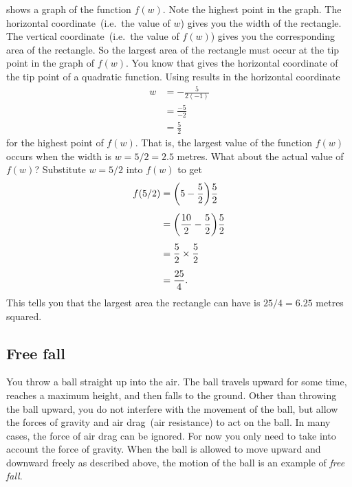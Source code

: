 \documentclass[a4paper,oneside,12pt]{article}
\begin{document}
\begin{solution}
 shows a graph of the function
$f(w)$.  Note the highest point in the graph.  The horizontal
coordinate~(i.e.~the value of $w$) gives you the width of the
rectangle.  The vertical coordinate~(i.e.~the value of $f(w)$) gives
you the corresponding area of the rectangle.  So the largest area of
the rectangle must occur at the tip point in the graph of $f(w)$.  You
know that  gives the
horizontal coordinate of the tip point of a quadratic function.  Using
 results in the horizontal
coordinate
\begin{align*}
w
&=
-\frac{5}{2(-1)} \\[4pt]
&=
\frac{-5}{-2} \\[4pt]
&=
\frac{5}{2}
\end{align*}
for the highest point of $f(w)$.  That is, the largest value of the
function $f(w)$ occurs when the width is $w = 5 / 2 = 2.5$ metres.
What about the actual value of $f(w)$?  Substitute $w = 5 / 2$ into
$f(w)$ to get
\begin{align*}
f(5/2)
&=
\parenthesis*{5 - \frac{5}{2}} \frac{5}{2} \\[4pt]
&=
\parenthesis*{\frac{10}{2} - \frac{5}{2}} \frac{5}{2} \\[4pt]
&=
\frac{5}{2} \times \frac{5}{2} \\[4pt]
&=
\frac{25}{4}.
\end{align*}
This tells you that the largest area the rectangle can have is
$25 / 4 = 6.25$ metres squared.
\end{solution}



\subsection*{Free fall}

You throw a ball straight up into the air.  The ball travels upward
for some time, reaches a maximum height, and then falls to the
ground.  Other than throwing the ball upward, you do not interfere
with the movement of the ball, but allow the forces of gravity and air
drag~(air resistance) to act on the ball.  In many cases, the force of
air drag can be ignored.  For now you only need to take into account
the force of gravity.  When the ball is allowed to move upward and
downward freely as described above, the motion of the ball is an
example of \emph{free fall}.
\end{document}
